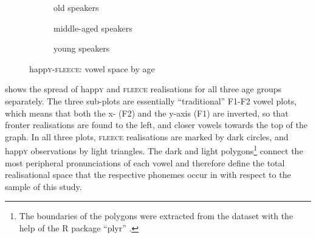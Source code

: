 \begin{figure}
	
	\begin{subfigure}{.49\textwidth}
		
			\resizebox{\linewidth}{!}{} 
		\caption{old speakers}
		\label{fig.happy.space.old}
	\end{subfigure}
	
	\begin{subfigure}{.49\textwidth}
		
			\resizebox{\linewidth}{!}{} 
		\caption{middle-aged speakers}
		\label{fig.happy.space.mid}
	\end{subfigure}
	\begin{subfigure}{.49\textwidth}
		
			\resizebox{\linewidth}{!}{} 
		\caption{young speakers}
		\label{fig.happy.space.young}
	\end{subfigure}
	\caption{happ\textsc{y}-\textsc{fleece}: vowel space by age}
	\label{fig.happy.space}
\end{figure}

 shows the spread of happ\textsc{y} and \textsc{fleece} realisations for all three age groups separately.
The three sub-plots are essentially ``traditional'' F1-F2 vowel plots, which means that both the x- (F2) and the y-axis (F1) are inverted, so that fronter realisations are found to the left, and closer vowels towards the top of the graph.
In all three plots, \textsc{fleece} realisations are marked by dark circles, and happ\textsc{y} observations by light triangles.
The dark and light polygons\footnote{The boundaries of the polygons were extracted from the dataset with the help of the R package ``plyr'' \parencite{plyr}.} connect the most peripheral pronunciations of each vowel and therefore define the total realisational space that the respective phonemes occur in with respect to the sample of this study.

